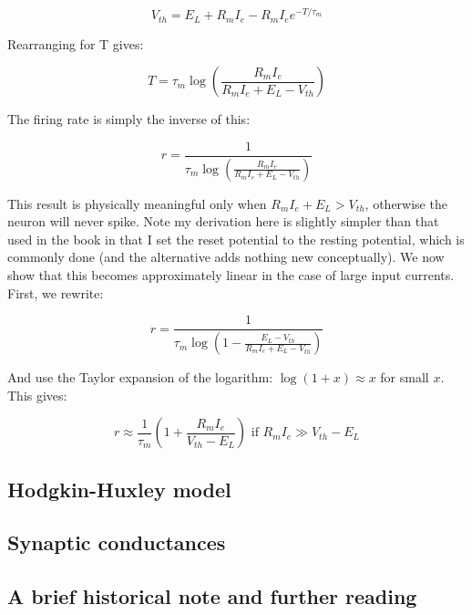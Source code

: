 \documentclass{article}
\begin{document}
\begin{equation*}
    V_{th} = E_L + R_mI_{e} - R_mI_{e}e^{-T/\tau_m}
\end{equation*}

Rearranging for T gives:

\begin{equation*}
    T = \tau_m\log\left(\frac{R_mI_e}{R_mI_e + E_L - V_{th}}\right)
\end{equation*}

The firing rate is simply the inverse of this:

\begin{equation*}
    r = \frac{1}{\tau_m\log\left(\frac{R_mI_e}{R_mI_e + E_L - V_{th}}\right)}
\end{equation*}

This result is physically meaningful only when $R_mI_e + E_L > V_{th}$, otherwise the neuron will never spike. Note my derivation here is slightly simpler than that used in the book in that I set the reset potential to the resting potential, which is commonly done (and the alternative adds nothing new conceptually). We now show that this becomes approximately linear in the case of large input currents. First, we rewrite:

\begin{equation*}
    r = \frac{1}{\tau_m\log\left(1 - \frac{E_L - V_{th}}{R_mI_e + E_L - V_{th}}\right)}
\end{equation*}

And use the Taylor expansion of the logarithm: $\log(1+x) \approx x$ for small $x$. This gives:

\begin{equation*}
    r \approx \frac{1}{\tau_m}\left(1+\frac{R_mI_e}{V_{th} - E_L}\right)\text{   if } R_mI_e \gg V_{th} - E_L
\end{equation*}

\subsection{Hodgkin-Huxley model}

\subsection{Synaptic conductances}

\subsection{A brief historical note and further reading}
\end{document}
